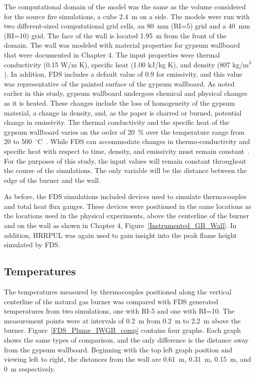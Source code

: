 \documentclass[twoside]{uocthesis}
\begin{document}
{The computational domain of the model was the same as the volume considered for the source fire simulations, a cube 2.4~m on a side. The models were run with two different-sized computational grid cells, an 80~mm (RI=5) grid and a 40~mm (RI=10) grid.  The face of the wall is located 1.95~m from the front of the domain.  
The wall was modeled with material properties for gypsum wallboard that were documented in Chapter 4.  The input properties were thermal conductivity (0.15 W/m K), specific heat (1.00 kJ/kg K), and density (807 kg/m$^3$).  In addition, FDS includes a default value of 0.9 for emissivity, and this value was representative of the painted surface of the gypsum wallboard. As noted earlier in this study, gypsum wallboard undergoes chemical and physical changes as it is heated.  These changes include the loss of homogeneity of the gypsum material, a change in density, and, as the paper is charred or burned, potential change in emissivity.  The thermal conductivity and the specific heat of the gypsum wallboard varies on the order of 20~$\%$ over the temperature range from 20 to 500~$^\circ$C~\cite{Gross:1985}.  While FDS can accommodate changes in thermo-conductivity and specific heat with respect to time, density, and emissivity must remain constant~\cite{FDS_Users_Guide}.  For the purposes of this study, the input values will remain constant throughout the course of the simulations.  The only variable will be the distance between the edge of the burner and the wall.

As before, the FDS simulations included devices used to simulate thermocouples and total heat flux gauges.  These devices were positioned in the same locations as the locations used in the physical experiments, above the centerline of the burner and on the wall as shown in Chapter 4, Figure~\ref{Instrumented_GB_Wall}. In addition, HRRPUL was again used to gain insight into the peak flame height simulated by FDS.  

\subsection{Temperatures}

 The temperatures measured by thermocouples positioned along the vertical centerline of the natural gas burner was compared with FDS generated temperatures from two simulations, one with RI-5 and one with RI=10.  The measurement points were at intervals of 0.2~m from 0.2~m to 2.2~m above the burner.  Figure~\ref{FDS_Plume_IWGB_comp} contains four graphs.  Each graph shows the same types of comparison, and the only difference is the distance away from the gypsum wallboard.  Beginning with the top left graph position and viewing left to right, the distances from the wall are 0.61~m, 0.31~m, 0.15~m, and 0~m respectively.  

}
\end{document}
